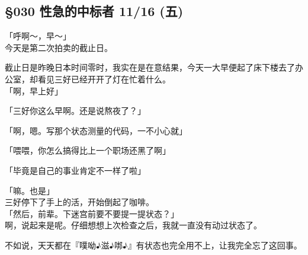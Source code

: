 \subsection{§030 性急的中标者 11/16 (五)}

「呼啊～，早～」\\

今天是第二次拍卖的截止日。

截止日是昨晚日本时间零时，我实在是在意结果，今天一大早便起了床下楼去了办公室，却看见三好已经开开了灯在忙着什么。\\

「啊，早上好」

「三好你这么早啊。还是说熬夜了？」

「啊，嗯。写那个状态测量的代码，一不小心就」

「喂喂，你怎么搞得比上一个职场还黑了啊」

「毕竟是自己的事业肯定不一样了啦」

「嘛。也是」\\

三好停下了手上的活，开始倒起了咖啡。\\

「然后，前辈。下迷宫前要不要提一提状态？」\\

啊，说起来是呢。仔细想想上次检查之后，我就一直没有动过状态了。

不如说，天天都在『噗呦♪滋♪𠳐♪』有状态也完全用不上，让我完全忘了这回事。\\

